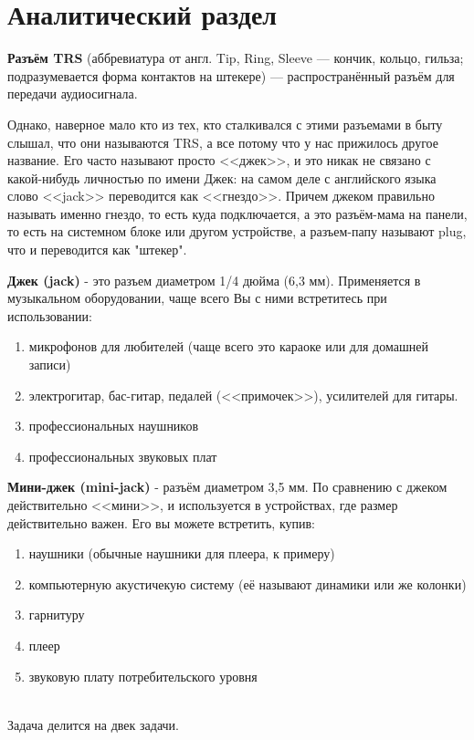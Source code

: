 \chapter{Аналитический раздел}

\textbf{Разъём TRS} (аббревиатура от англ. Tip, Ring, Sleeve — кончик, кольцо, гильза; подразумевается форма контактов на штекере) — распространённый разъём для передачи аудиосигнала. \cite{wiki-trs}

Однако, наверное мало кто из тех, кто сталкивался с этими разъемами в быту слышал, что они называются TRS, а все потому что у нас прижилось другое название. Его часто называют просто <<джек>>, и это никак не связано с какой-нибудь личностью по имени Джек: на самом деле с английского языка слово <<jack>> переводится как <<гнездо>>. Причем джеком правильно называть именно гнездо, то есть куда подключается, а это разъём-мама на панели, то есть на системном блоке или другом устройстве, а разъем-папу называют plug, что и переводится как "штекер". \cite{kkg-jack}

\textbf{Джек (jack)} - это разъем диаметром 1/4 дюйма (6,3 мм). Применяется в музыкальном оборудовании, чаще всего Вы с ними встретитесь при использовании:
\begin{enumerate}
\item микрофонов для любителей (чаще всего это караоке или для домашней записи)
\item электрогитар, бас-гитар, педалей (<<примочек>>), усилителей для гитары.
\item профессиональных наушников
\item профессиональных звуковых плат
\end{enumerate}


\textbf{Мини-джек (mini-jack)} - разъём диаметром 3,5 мм. По сравнению с джеком действительно <<мини>>, и используется в устройствах, где размер действительно важен. Его вы можете встретить, купив:
\begin{enumerate}
\item наушники (обычные наушники для плеера, к примеру)
\item компьютерную акустичекую систему (её называют динамики или же колонки) 
\item гарнитуру
\item плеер
\item звуковую плату потребительского уровня
\end{enumerate}

\HRule \\
Задача делится на двек задачи.

